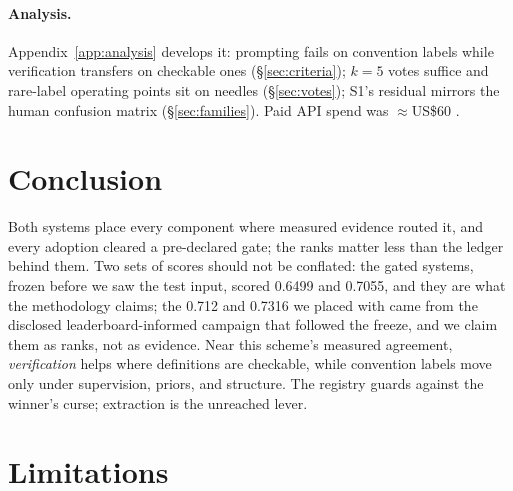 \documentclass[11pt]{article}
\begin{document}
\paragraph{Analysis.}\label{sec:analysis} Appendix~\ref{app:analysis}
develops it: prompting fails on convention labels while verification
transfers on checkable ones (\S\ref{sec:criteria}); $k{=}5$ votes
suffice and rare-label operating points sit on needles
(\S\ref{sec:votes}); S1's residual mirrors the human confusion matrix
(\S\ref{sec:families}). Paid API spend was ${\approx}$US\$60
\citep{dodge-etal-2019-show}.

\section{Conclusion}
\label{sec:conclusion}

Both systems place every component where measured evidence routed it,
and every adoption cleared a pre-declared gate; the ranks matter less
than the ledger behind them. Two sets of scores should not be
conflated: the gated systems, frozen before we saw the test input,
scored 0.6499 and 0.7055, and they are what the methodology claims;
the 0.712 and 0.7316 we placed with came from the disclosed
leaderboard-informed campaign that followed the freeze, and we claim
them as ranks, not as evidence. Near this scheme's measured
agreement, \emph{verification}
helps where definitions are checkable, while convention labels move
only under supervision, priors, and structure. The registry guards
against the winner's curse; extraction is the unreached lever.

\section*{Limitations}
\end{document}
